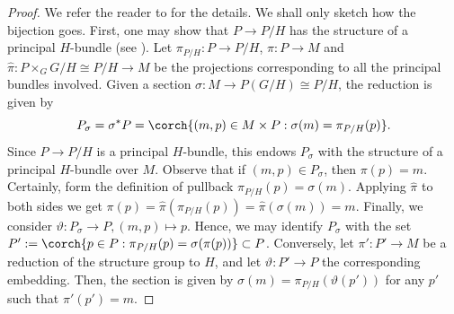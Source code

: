 \begin{proof}
    We refer the reader to \parencite[I Prop. 5.6]{kobayashi_vol1} for the details. We shall only sketch how the bijection goes. First, one may show that \(P \to P/H\) has the structure of a principal \(H\)-bundle (see \parencite[I Prop. 5.5]{kobayashi_vol1}). Let \(\pi_{P/H}\colon P \to P/H\), \(\pi\colon P\to M\) and \(\hat{\pi}\colon P\times_G G/H \cong P/H \to M\) be the projections corresponding to all the principal bundles involved. Given a section \(\sigma\colon M \to P(G/H)\cong P/H\), the reduction is given by 
    \[
    P_\sigma=\sigma^*P=\corch{(m,p)\in M \times P: \sigma(m)=\pi_{P/H}(p)}.
    \]
    Since \(P\to P/H\) is a principal \(H\)-bundle, this endows \(P_\sigma\) with the structure of a principal \(H\)-bundle over \(M\). Observe that if \((m,p)\in P_\sigma\), then \(\pi(p)=m\). Certainly, form the definition of pullback \(\pi_{P/H}(p)=\sigma(m)\). Applying \(\hat{\pi}\) to both sides we get \(\pi(p)=\hat\pi(\pi_{P/H}(p))=\hat{\pi}(\sigma(m))=m\). Finally, we consider \(\vartheta\colon P_\sigma \to P, (m,p) \mapsto p\). Hence, we may identify \(P_\sigma\) with the set \(P':=\corch{p \in P: \pi_{P/H}(p)=\sigma(\pi(p))}\subset P\). Conversely, let \(\pi'\colon P'\to M\) be a reduction of the structure group to \(H\), and let \(\vartheta\colon P'\to P\) the corresponding embedding. Then, the section is given by \(\sigma(m)=\pi_{P/H}(\vartheta(p'))\) for any \(p'\) such that \(\pi'(p')=m\).
\end{proof}

